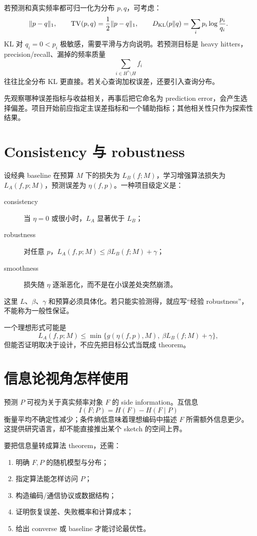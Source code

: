 若预测和真实频率都可归一化为分布 $p,q$，可考虑：
\[
\lVert p-q\rVert_1,
\qquad
\mathrm{TV}(p,q)=\frac12\lVert p-q\rVert_1,
\qquad
D_{\mathrm{KL}}(p\Vert q)=\sum_i p_i\log\frac{p_i}{q_i}.
\]
KL 对 $q_i=0<p_i$ 极敏感，需要平滑与方向说明。若预测目标是 heavy hitters，precision/recall、漏掉的频率质量
\[
\sum_{i\in H^*\setminus H} f_i
\]
往往比全分布 KL 更直接。若关心查询加权误差，还要引入查询分布。

\begin{warningbox}
先观察哪种误差指标与收益相关，再事后把它命名为 prediction error，会产生选择偏差。项目开始前应指定主误差指标和一个辅助指标；其他相关性只作为探索性结果。
\end{warningbox}

\section{Consistency 与 robustness}

设经典 baseline 在预算 $M$ 下的损失为 $L_B(f;M)$，学习增强算法损失为 $L_A(f,p;M)$，预测误差为 $\eta(f,p)$。一种项目级定义是：
\begin{description}
  \item[consistency] 当 $\eta=0$ 或很小时，$L_A$ 显著优于 $L_B$；
  \item[robustness] 对任意 $p$，$L_A(f,p;M)\le \beta L_B(f;M)+\gamma$；
  \item[smoothness] 损失随 $\eta$ 逐渐恶化，而不是在小误差处突然崩溃。
\end{description}
这里 $L$、$\beta$、$\gamma$ 和预算必须具体化。若只能实验测得，就应写“经验 robustness”，不能称为一般性保证。

一个理想形式可能是
\[
L_A(f,p;M)\le
\min\{g(\eta(f,p),M),\ \beta L_B(f;M)+\gamma\},
\]
但能否证明取决于设计，不应先把目标公式当既成 theorem。

\section{信息论视角怎样使用}

预测 $P$ 可视为关于真实频率对象 $F$ 的 side information。互信息
\[
I(F;P)=H(F)-H(F\mid P)
\]
衡量平均不确定性减少；条件熵低意味着理想编码中描述 $F$ 所需额外信息更少。这提供研究语言，却不能直接推出某个 sketch 的空间上界。

要把信息量转成算法 theorem，还需：
\begin{enumerate}
  \item 明确 $F,P$ 的随机模型与分布；
  \item 指定算法能怎样访问 $P$；
  \item 构造编码/通信协议或数据结构；
  \item 证明恢复误差、失败概率和计算成本；
  \item 给出 converse 或 baseline 才能讨论最优性。
\end{enumerate}

